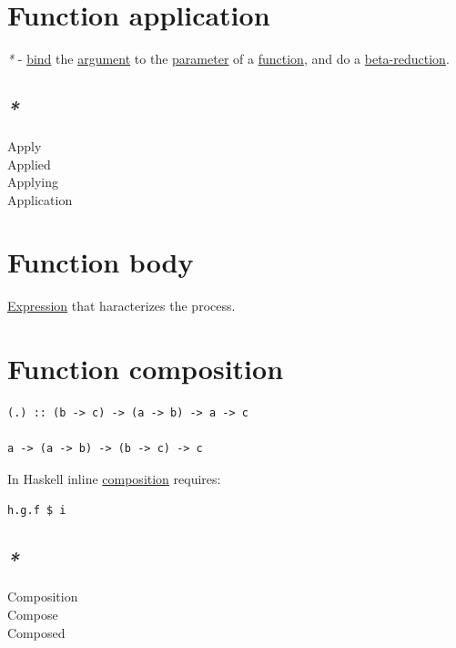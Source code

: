\documentclass[a4paper,14pt,oneside]{book}
\begin{document}
\section{\label{org01158aa}Function application}
\label{sec:orgeb45b39}
\emph{*} - \hyperref[orgfd2c016]{bind} the \hyperref[orgc64e250]{argument} to the \hyperref[orga2e5d96]{parameter} of a \hyperref[org39271b2]{function}, and do a \hyperref[orgd7e7d93]{beta-reduction}.\\

\subsection{\emph{*}}
\label{sec:org3686604}

\label{org78f3ce9}Apply\\
\label{org008dd98}Applied\\
\label{org580eafc}Applying\\
\label{org1793e06}Application\\

\section{\label{orgdbba7f9}Function body}
\label{sec:org253f41d}
\hyperref[org4eaaefd]{Expression} that haracterizes the process.\\

\section{\label{org9aa90f2}Function composition}
\label{sec:org83f84b3}
\begin{verbatim}
(.) :: (b -> c) -> (a -> b) -> a -> c

a -> (a -> b) -> (b -> c) -> c
\end{verbatim}

In Haskell inline \hyperref[orgde6ed92]{composition} requires:\\
\begin{verbatim}
h.g.f $ i
\end{verbatim}

\subsection{\emph{*}}
\label{sec:org30b756f}

\label{orga5e65bc}Composition\\
\label{org8facb25}Compose\\
\label{org7f1f5e3}Composed\\
\end{document}
